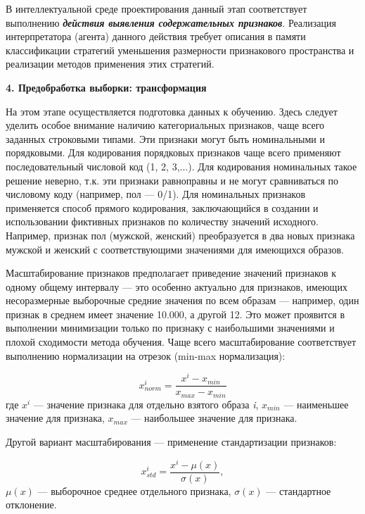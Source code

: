 В интеллектуальной среде проектирования данный этап соответствует выполнению \textbf{\textit{действия выявления содержательных признаков}}. Реализация интерпретатора (агента) данного действия требует описания в памяти классификации стратегий уменьшения размерности признакового пространства и реализации методов применения этих стратегий.


\textbf{4. Предобработка выборки: трансформация}

На этом этапе осуществляется подготовка данных к обучению.
Здесь следует уделить особое внимание наличию категориальных признаков, чаще всего заданных строковыми типами. Эти признаки могут быть номинальными и порядковыми. Для кодирования порядковых признаков чаще всего применяют последовательный числовой код (1, 2, 3,...). Для кодирования номинальных такое решение неверно, т.к. эти признаки равноправны и не могут сравниваться по числовому коду (например, пол --- 0/1). Для номинальных признаков применяется способ прямого кодирования, заключающийся в создании и использовании фиктивных признаков по количеству значений исходного. Например, признак пол (мужской, женский) преобразуется в два новых признака мужской и женский с соответствующими значениями для имеющихся образов.

Масштабирование признаков предполагает приведение значений признаков к одному общему интервалу --- это особенно актуально для признаков, имеющих несоразмерные выборочные средние значения по всем образам --- например, один признак в среднем имеет значение 10.000, а другой 12. Это может проявится в выполнении минимизации только по признаку с наибольшими значениями и плохой сходимости метода обучения. Чаще всего масштабирование соответствует выполнению нормализации на отрезок (min-max нормализация):

\begin{equation*}
	x_{norm}^i = \frac{x^i - x_{min}}{x_{max} - x_{min}}
\end{equation*}
где $x^i$ --- значение признака для отдельно взятого образа \textit{i}, $x_{min}$ --- наименьшее значение для признака, $x_{max}$ --- наибольшее значение для признака.

Другой вариант масштабирования --- применение стандартизации признаков:

\begin{equation*}
	x_{std}^i = \frac{x^i - \mu(x)}{\sigma(x)},
\end{equation*}
$\mu(x)$ --- выборочное среднее отдельного признака, $\sigma(x)$ --- стандартное отклонение.

